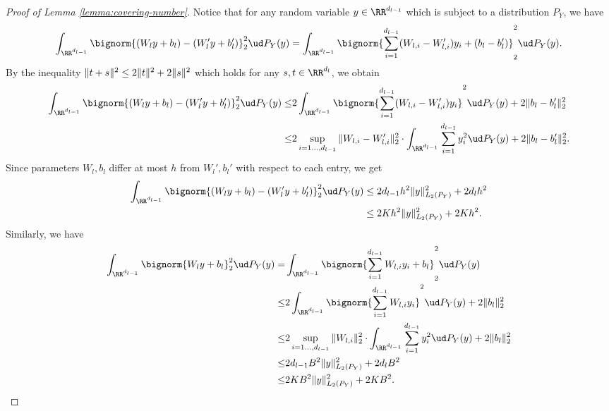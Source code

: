 \begin{proof}[Proof of Lemma \ref{lemma:covering-number}]
    Notice that for any random variable $y \in \RR^{d_{l-1}}$ which is subject to a distribution $P_Y$, we have
    \begin{equation*}
         \int_{\RR^{d_{l-1}}} \bignorm{ ( W_l y+ b_l)-( W_l' y+ b_l')}_2^2 \ud P_Y(y) =  \int_{\RR^{d_{l-1}}}   \bignorm{ \sum_{i=1}^{d_{l-1}} (W_{l,i} - W_{l,i}') y_i+(b_l- b_l') }_2^2 \ud P_Y(y).
    \end{equation*}
    By the inequality $\|t+s\|^2 \leq 2\|t\|^2 + 2\|s\|^2$ which holds for any $s,t\in \RR^{d_l}$, we obtain
    \begin{align*}
        \int_{\RR^{d_{l-1}}} \bignorm{ ( W_l y+ b_l)-( W_l' y+ b_l')}_2^2 \ud P_Y(y) 
        \leq & 2 \int_{\RR^{d_{l-1}}}  \bignorm{\sum_{i=1}^{d_{l-1}}  (W_{l,i}-W_{l,i}') y_i  }^2 \ud P_Y(y)  + 2 \norm {b_l-b_l'}_2^2 \\
        \leq &  2 \sup_{i=1\ldots,d_{l-1}} \norm{ W_{l,i}-W_{l,i}' }_2^2 \cdot \int_{\RR^{d_{l-1}}}  \sum_{i=1}^{d_{l-1}} y_i^2  \ud P_Y(y)  + 2 \norm {b_l-b_l'}_2^2.
    \end{align*}
    Since parameters $W_l,b_l$ differ at most $h$ from $W_l',b_l'$ with respect to each entry, we get 
    \begin{align}\label{eq:difference1}
    \int_{\RR^{d_{l-1}}} \bignorm{ ( W_l y+ b_l)-( W_l' y+ b_l')}_2^2 \ud P_Y(y) 
        &\leq  2 d_{l-1} h^2 \norm{y}^2_{L_2(P_Y)} + 2 d_l h^2 \notag \\
        &\leq   2 K h^2 \norm{y}^2_{L_2(P_Y)} + 2 K h^2 .
    \end{align}
Similarly, we have
\begin{align}\label{eq:difference2}
    \int_{\RR^{d_{l-1}}} \bignorm{  W_l y+ b_l }_2^2 \ud P_Y(y) = & \int_{\RR^{d_{l-1}}}   \bignorm{ \sum_{i=1}^{d_{l-1}} W_{l,i}  y_i + b_l }_2^2 \ud P_Y(y) \notag \\
        \leq & 2 \int_{\RR^{d_{l-1}}}  \bignorm{ \sum_{i=1}^{d_{l-1}}  W_{l,i} y_i}^2 \ud P_Y(y)+ 2 \norm {b_l}_2^2 \notag  \\
        \leq &  2 \sup_{i=1\ldots,d_{l-1}} \norm{ W_{l,i} }_2^2 \cdot \int_{\RR^{d_{l-1}}}  \sum_{i=1}^{d_{l-1}} y_i^2  \ud P_Y(y)  + 2 \norm {b_l}_2^2 \notag \\
        \leq &  2 d_{l-1} B^2 \norm{y}^2_{L_2(P_Y)}  + 2 d_l B^2 \notag\\
        \leq &  2 K B^2 \norm{y}^2_{L_2(P_Y)}  + 2 K B^2.
\end{align}


\end{proof}
